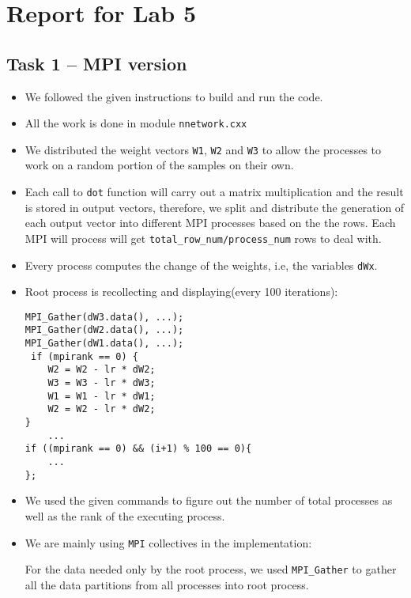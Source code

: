 \documentclass[a4paper, DIV12, headsepline]{scrartcl}
\begin{document}
\section*{Report for Lab 5}
\subsection*{Task 1 -- MPI version}
\begin{itemize}
\item We followed the given instructions to build and run the code.

\item All the work is  done in module \texttt{nnetwork.cxx}

\item We distributed the weight vectors \texttt{W1}, \texttt{W2} and \texttt{W3} to allow the processes to work on a random portion of the samples on their own.

\item Each call to  \texttt{dot} function will carry out a matrix multiplication and the result is stored in output vectors,
therefore, we split and distribute the generation of each output vector into different MPI processes based on the the rows. Each MPI will process will get \texttt{total\_row\_num/process\_num} rows to deal with.


\item Every process computes the change of the weights, i.e, the variables \texttt{dWx}.

\item Root process is recollecting and displaying(every 100 iterations):

\begin{verbatim}
MPI_Gather(dW3.data(), ...);
MPI_Gather(dW2.data(), ...);
MPI_Gather(dW1.data(), ...);
 if (mpirank == 0) {
    W2 = W2 - lr * dW2;
    W3 = W3 - lr * dW3;
    W1 = W1 - lr * dW1;
    W2 = W2 - lr * dW2;
}
    ...
if ((mpirank == 0) && (i+1) % 100 == 0){
    ...
};
\end{verbatim}
\item We used the given commands to figure out the number of total processes as well as the rank of the executing process.

\item We are mainly using  \texttt{MPI} collectives in the implementation:

For the data needed only by the root process, we used  \texttt{MPI\_Gather} to gather all the data partitions from all processes into root process.


\end{itemize}
\end{document}
